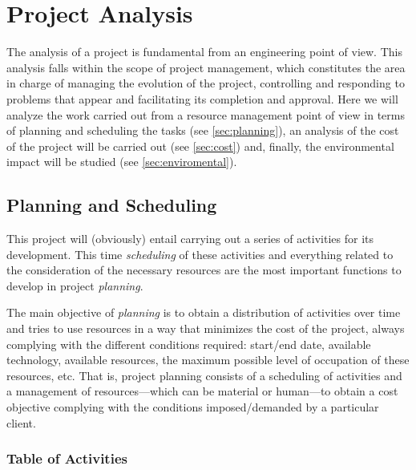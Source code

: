 

\chapter{Project Analysis}\label{cha:analysis}



\drop The analysis of a project is fundamental from an engineering point of
view. This analysis falls within the scope of project management, which
constitutes the area in charge of managing the evolution of the project,
controlling and responding to problems that appear and facilitating its
completion and approval. Here we will analyze the work carried out from a
resource management point of view in terms of planning and scheduling the tasks
(see \vref{sec:planning}), an analysis of the cost of the project will be
carried out (see \vref{sec:cost}) and, finally, the environmental impact will
be studied (see \vref{sec:enviromental}).



\section{Planning and Scheduling}%
\label{sec:planning}

This project will (obviously) entail carrying out a series of activities for
its development. This time \emph{scheduling} of these activities and everything
related to the consideration of the necessary resources are the most important
functions to develop in project \emph{planning}.

The main objective of \emph{planning} is to obtain a distribution of activities
over time and tries to use resources in a way that minimizes the cost of the
project, always complying with the different conditions required: start/end
date, available technology, available resources, the maximum possible level of
occupation of these resources, etc. That is, project planning consists of a
scheduling of activities and a management of resources---which can be material
or human---to obtain a cost objective complying with the conditions
imposed/demanded by a particular client.


\subsection{Table of Activities}\label{sec:activities}




